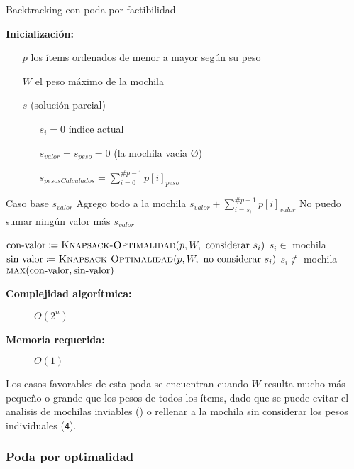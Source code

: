 \documentclass[fleqn, 11pt]{article}
\def\is{\coloneqq}
\begin{document}
\begin{algorithm}
\caption{Backtracking con poda por factibilidad}
\begin{algorithmic}[1]
\item[\textbf{Inicialización:}]
\item[] \begin{itemize}
	\item[] $p$ los ítems ordenados de menor a mayor según su peso
	\item[] $W$ el peso máximo de la mochila
	\item[] $s$ (solución parcial)
	\begin{itemize}
		\item[] $s_i = 0$ índice actual
		\item[] $s_{valor} = s_{peso} = 0$ (la mochila vacia \O)
		\item[] $s_{pesosCalculados} = \sum_{i = 0}^{\#p - 1} p[i]_{peso}$
	\end{itemize}
\end{itemize}
\Statex
{}
	\Comment Caso base
	\State \Return $s_{valor}$
\EndIf
{}
	\Comment Agrego todo a la mochila
	\State \Return $s_{valor} + \sum_{i=s_i}^{\#p - 1} p[i]_{valor}$
\EndIf
{}
	\Comment No puedo sumar ningún valor más
	\State \Return $s_{valor}$
\EndIf

\State $\text{con-valor} \is \Call{Knapsack-Optimalidad}{p, W, \text{ considerar } s_i}$
\Comment $s_i \in$ mochila
\State $\text{sin-valor} \is \Call{Knapsack-Optimalidad}{p, W, \text{ no considerar } s_i}$
\Comment $s_i \not\in$ mochila
\State \Return $\Call{max}{\text{con-valor}, \text{sin-valor}}$
\EndFunction
\end{algorithmic}
\begin{description}
	\item[\textbf{Complejidad algorítmica:}] $O(2^n)$
	\item[\textbf{Memoria requerida:}] $O(1)$
\end{description}
\end{algorithm}

Los casos favorables de esta poda se encuentran cuando $W$ resulta mucho más
pequeño o grande que los pesos de todos los ítems, dado que se puede evitar el
analisis de mochilas inviables () o rellenar a la mochila sin
considerar los pesos individuales (\texttt{4}).

\subsubsection{Poda por optimalidad}
\end{document}
